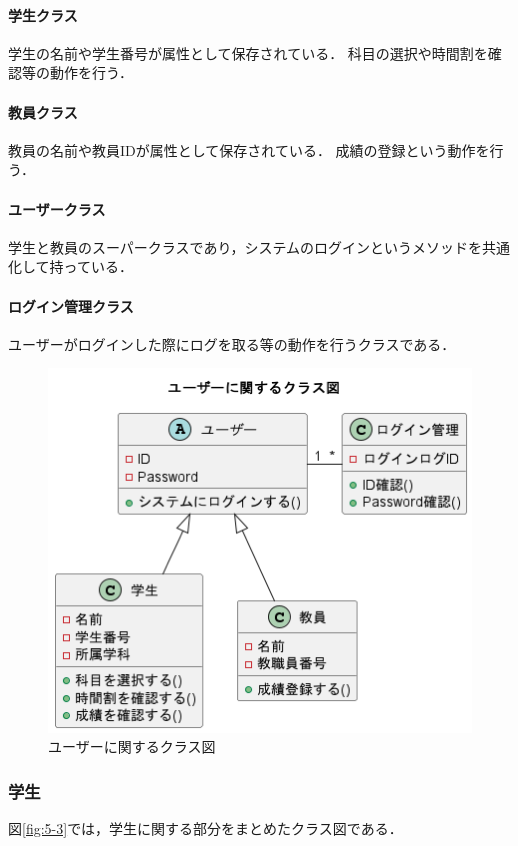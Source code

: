 \documentclass[documentclass]{jsarticle}
\begin{document}
\paragraph*{学生クラス}
学生の名前や学生番号が属性として保存されている．
科目の選択や時間割を確認等の動作を行う．

\paragraph*{教員クラス}
教員の名前や教員IDが属性として保存されている．
成績の登録という動作を行う．

\paragraph*{ユーザークラス}
学生と教員のスーパークラスであり，システムのログインというメソッドを共通化して持っている．

\paragraph*{ログイン管理クラス}
ユーザーがログインした際にログを取る等の動作を行うクラスである．

\begin{figure}[H]
  \begin{center}
    \includegraphics*[scale=0.4]{figure/5-2.png}
  \end{center}
  \caption{ユーザーに関するクラス図}
  \label{fig:5-2}
\end{figure}

\subsubsection*{学生}
図\ref*{fig:5-3}では，学生に関する部分をまとめたクラス図である．
\end{document}
